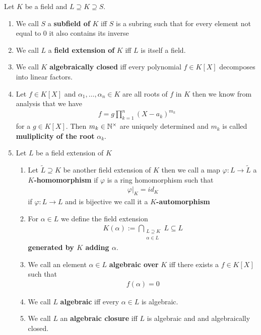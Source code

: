 \documentclass[]{article}
\begin{document}
\begin{definition*} Let \(K\) be a field and \(L \supseteq K \supseteq S\).
    \begin{enumerate}
        \item We call \(S\) a \textbf{subfield of} \(K\) iff \(S\) is a subring such that for every element not equal to \(0\) it also contains its inverse
        \item We call \(L\) a \textbf{field extension of} \(K\) iff \(L\) is itself a field. 
        \item We call \(K\) \textbf{algebraically closed} iff every polynomial \(f \in K[X]\) decomposes into linear factors.
        \item Let \(f \in K[X]\) and \(\alpha_1, \dots, \alpha_n \in K\) are all roots of \(f\) in \(K\) then we know from analysis that we have
        \begin{align*}
            f=g \prod_{k=1}^{n}(X-a_k)^{m_k}
        \end{align*}
        for a \(g \in K[X]\). Then \(m_k \in {\mathbb{N}}^\times\) are uniquely determined and \(m_k\) is called \textbf{muliplicity of the root} \(\alpha_k\).
        \item Let \(L\) be a field extension of \(K\) 
        \begin{enumerate}
            \item Let \(\tilde{L} \supseteq K\) be another field extension of \(K\) then we call a map
                \(\varphi:L \rightarrow \tilde{L}\) a \textbf{\(K\)-homomorphism} if \(\varphi\) is a ring homomorphism such that 
                \begin{align*}
                    \varphi |_K = id_K
                \end{align*}
                if \(\varphi:L \rightarrow L\) and is bijective we call it a \textbf{\(K\)-automorphism}
            \item For \(\alpha \in L\) we define the field extension 
            \begin{align*}
                K(\alpha):= \bigcap_{\substack{L \supseteq K \\ \alpha \in L}} L \subseteq L
            \end{align*}
            \textbf{generated by \(K\) adding \(\alpha\)}.
            \item We call an element \(\alpha \in L\) \textbf{algebraic over} \(K\) iff
            there exists a \(f \in K[X]\) such that
            \begin{align*}
                f(\alpha) = 0
            \end{align*}
            \item We call \(L\) \textbf{algebraic} iff every \(\alpha \in L\) is algebraic.
            \item We call \(L\) an \textbf{algebraic closure} iff \(L\) is algebraic and and algebraically closed.
        \end{enumerate} 
    \end{enumerate}
\end{definition*}
\end{document}
